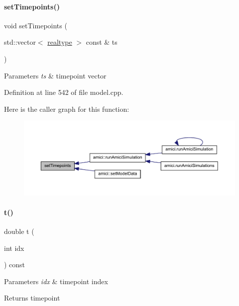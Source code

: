 \paragraph{\texorpdfstring{set\+Timepoints()}{setTimepoints()}}
{\footnotesize\ttfamily void set\+Timepoints (\begin{DoxyParamCaption}\item[{std\+::vector$<$ \mbox{\hyperlink{namespaceamici_a1bdce28051d6a53868f7ccbf5f2c14a3}{realtype}} $>$ const \&}]{ts }\end{DoxyParamCaption})}


\begin{DoxyParams}{Parameters}
{\em ts} & timepoint vector \\
\hline
\end{DoxyParams}


Definition at line 542 of file model.\+cpp.

Here is the caller graph for this function\+:
\nopagebreak
\begin{figure}[H]
\begin{center}
\leavevmode
\includegraphics[width=350pt]{classamici_1_1_model_a50f9642f9bcb883dbd3925c85abc4c24_icgraph}
\end{center}
\end{figure}
\mbox{\label{classamici_1_1_model_a711281d57e9710226face29151cc4641}} 
\paragraph{\texorpdfstring{t()}{t()}}
{\footnotesize\ttfamily double t (\begin{DoxyParamCaption}\item[{int}]{idx }\end{DoxyParamCaption}) const}


\begin{DoxyParams}{Parameters}
{\em idx} & timepoint index \\
\hline
\end{DoxyParams}
\begin{DoxyReturn}{Returns}
timepoint 
\end{DoxyReturn}


